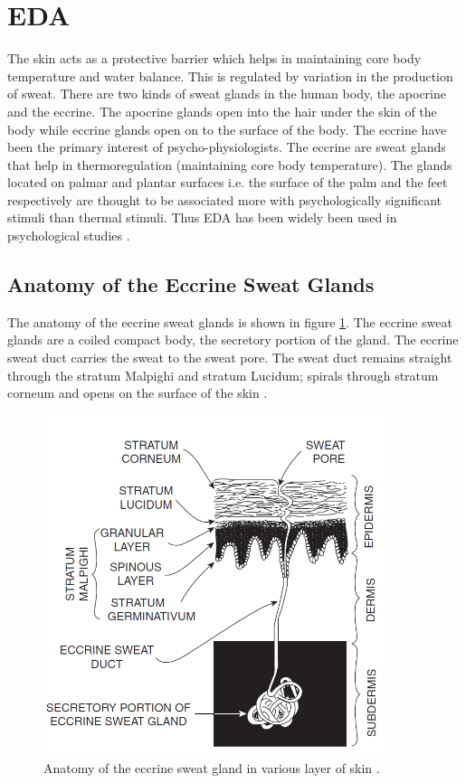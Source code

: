 \section{EDA}
The skin acts as a protective barrier which helps in maintaining core body temperature and water balance. This is regulated by variation in the production of sweat. There are two kinds of sweat glands in the human body, the apocrine and the eccrine. The apocrine glands open into the hair under the skin of the body while eccrine glands open on to the surface of the body. The eccrine have been the primary interest of psycho-physiologists. The eccrine are sweat glands that help in thermoregulation (maintaining core body temperature). The glands located on palmar and plantar surfaces i.e. the surface of the palm and the feet respectively are thought to be associated more with psychologically significant stimuli than thermal stimuli. Thus EDA has been widely been used in psychological studies \cite{cacioppo_electrodermal_2016_p_217_243}.

\subsection{Anatomy of the Eccrine Sweat Glands}
The anatomy of the eccrine sweat glands is shown in figure \ref{fig:eccrine_glands}. The eccrine sweat glands are a coiled compact body, the secretory portion of the gland. The eccrine sweat duct carries the sweat to the sweat pore. The sweat duct remains straight through the stratum Malpighi and stratum Lucidum; spirals through stratum corneum and opens on the surface of the skin \cite{cacioppo_electrodermal_2016_p_217_243}.
\begin{figure}
    \centering
    \includegraphics[width=100mm]{Figures/eccrine_glands.PNG}
    \caption{Anatomy of the eccrine sweat gland in various layer of skin \cite{hassett_primer_1978}.}
    \label{fig:eccrine_glands}
\end{figure}

